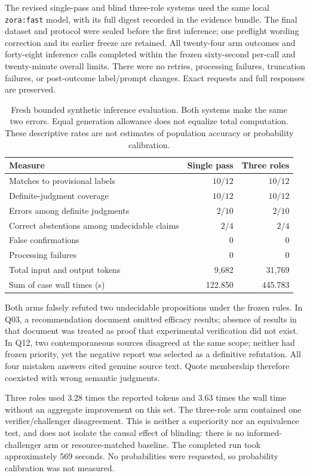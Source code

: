 The revised single-pass and blind three-role systems used the same local \texttt{zora:fast} model, with its full digest recorded in the evidence bundle. The final dataset and protocol were sealed before the first inference; one preflight wording correction and its earlier freeze are retained. All twenty-four arm outcomes and forty-eight inference calls completed within the frozen sixty-second per-call and twenty-minute overall limits. There were no retries, processing failures, truncation failures, or post-outcome label/prompt changes. Exact requests and full responses are preserved.

\begin{table}[htbp]
\centering
\begin{tabular}{@{}lrr@{}}
\toprule
Measure & Single pass & Three roles\\\midrule
Matches to provisional labels & $10/12$ & $10/12$\\
Definite-judgment coverage & $10/12$ & $10/12$\\
Errors among definite judgments & $2/10$ & $2/10$\\
Correct abstentions among undecidable claims & $2/4$ & $2/4$\\
False confirmations & 0 & 0\\
Processing failures & 0 & 0\\
Total input and output tokens & 9,682 & 31,769\\
Sum of case wall times (s) & 122.850 & 445.783\\
\bottomrule
\end{tabular}
\caption{Fresh bounded synthetic inference evaluation. Both systems make the same two errors. Equal generation allowance does not equalize total computation. These descriptive rates are not estimates of population accuracy or probability calibration.}
\label{tab:fresh-pilot}
\end{table}

Both arms falsely refuted two undecidable propositions under the frozen rules. In Q03, a recommendation document omitted efficacy results; absence of results in that document was treated as proof that experimental verification did not exist. In Q12, two contemporaneous sources disagreed at the same scope; neither had frozen priority, yet the negative report was selected as a definitive refutation. All four mistaken answers cited genuine source text. Quote membership therefore coexisted with wrong semantic judgments.

Three roles used $3.28$ times the reported tokens and $3.63$ times the wall time without an aggregate improvement on this set. The three-role arm contained one verifier/challenger disagreement. This is neither a superiority nor an equivalence test, and does not isolate the causal effect of blinding: there is no informed-challenger arm or resource-matched baseline. The completed run took approximately 569 seconds. No probabilities were requested, so probability calibration was not measured.

